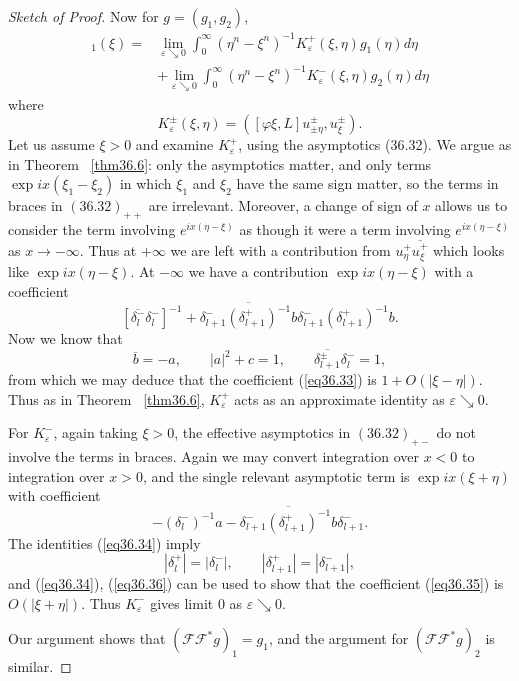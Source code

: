 \documentclass{surv-l}
\theoremstyle{plain}
\theoremstyle{definition}
\numberwithin{equation}{chapter}
\begin{document}
\begin{proof}[Sketch of Proof]
Now for $g =(g_{1},g_{2})$,
\begin{align*}
[2\pi \mathscr{F}\!\!\mathscr{F}^{*}g]_{1}(\xi)=&\lim_{\varepsilon\searrow 0}\int_{0}^{\infty}(\eta^{n}-\xi^{n})^{-1}K_{\varepsilon}^{+}(\xi,\eta)g_{1}(\eta)d\eta\\
&+\lim_{\varepsilon\searrow0}\int_{0}^{\infty}(\eta^{n}-\xi^{n})^{-1}K_{\varepsilon}^{-}(\xi, \eta)g_{2}(\eta)d\eta
\end{align*}
where
\begin{equation*}
K_{\varepsilon}^{\pm}(\xi, \eta)=([\varphi\xi,L]u_{\pm\eta}^{\pm},u_{\xi}^{\pm}).
\end{equation*}
Let us assume $\xi>0$ and examine $K_{\varepsilon}^{+}$, using the asymptotics (36.32). We argue as in Theorem ~\ref{thm36.6}: only the asymptotics matter, and only terms $\exp ix(\xi_{1}-\xi_{2})$ in which $\xi_{1}$ and $\xi_{2}$ have the same sign matter, so the terms in braces in $(36.32)_{++}$ are irrelevant. Moreover, a change of sign of $x$ allows us to consider the term involving $e^{ix(\eta-\xi)}$ as though it were a term involving $e^{ix(\eta-\xi)}$ as $ x\rightarrow-\infty$. Thus at $+\infty$ we are left with a contribution from $u_{\eta}^{+}\overline{u_{\xi}^{+}}$ which looks like $\exp ix(\eta-\xi)$. At $-\infty$ we have a contribution $\exp ix(\eta-\xi)$ with a coefficient
\setcounter{equation}{32}
\begin{equation}\label{eq36.33} [\overline{\delta_{l}^{-}}\delta_{l}^{-}]^{-1}+\overline{\delta_{l+1}^{-}(\delta_{l+1}^{+})^{-1}b}\delta_{l+1}^{-}(\delta_{l+1}^{+})^{-1}b.
\end{equation}
Now we know that
\begin{equation}\label{eq36.34}
\overline{b}=-a,\qquad |a|^{2}+c=1,\qquad \overline{\delta_{l+1}^{\pm}}\delta_{l}^{-}=1,
\end{equation}
from which we may deduce that the coefficient (\ref{eq36.33}) is $1+O(|\xi-\eta|)$. Thus as in Theorem ~\ref{thm36.6}, $K_{\varepsilon}^{+}$ acts as an approximate identity as $\varepsilon\searrow 0$.

For $K_{\varepsilon}^{-}$, again taking $\xi>0$, the effective asymptotics in $(36.32)_{+-}$ do not involve the terms in braces. Again we may convert integration over $x<0$ to integration over $x>0$, and the single relevant asymptotic term is $\exp ix(\xi+\eta)$ with coefficient
\begin{equation}\label{eq36.35}
-(\delta_{l}^{-})^{-1}a-\overline{\delta_{l+1}^{-}(\delta_{l+1}^{+})^{-1}b}\delta_{l+1}^{-}.
\end{equation}
The identities (\ref{eq36.34}) imply
\begin{equation}\label{eq36.36}
|\delta_{l}^{+}|=|\delta_{l}^{-}|,\qquad|\delta_{l+1}^{+}|=|\delta_{l+1}^{-}|,
\end{equation}
and (\ref{eq36.34}), (\ref{eq36.36}) can be used to show that the coefficient (\ref{eq36.35}) is $O(|\xi+\eta|)$. Thus $K_{\varepsilon}^{-}$ gives limit $0$ as $\varepsilon\searrow 0$.

Our argument shows that $(\mathscr{F}\!\!\mathscr{F}^{*}g)_{1}=g_{1}$, and the argument for $(\mathscr{F}\!\!\mathscr{F}^{*}g)_{2}$ is similar.
\end{proof}
\end{document}
